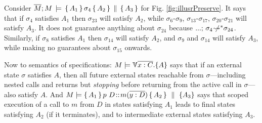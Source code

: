 {\begin{example}
Consider ${\overline{M}; M\, \models \, \{\, A_1\,\}\, \sigma_{4} \, \{\, A_2\,\} \,\parallel\, \{\, A_3\,\}  }$   
for Fig. \ref{fig:illusrPreserve}.
It says that  if  $\sigma_4$ satisfies $A_1$ 
then $\sigma_{23}$ will satisfy $A_2$, while $\sigma_6$-$\sigma_9$, $\sigma_{13}$-$\sigma_{17}$, $\sigma_{20}$-$\sigma_{21}$ will satisfy $A_3$.
It does not guarantee anything about $\sigma_{24}$ because $...;\, {\sigma_4} \not\!\!\!{\rightsquigarrow^*} \sigma_{24}$.
Similarly, if $\sigma_8$ satisfies $A_1$ 
then $\sigma_{14}$ will satisfy $A_2$, and  $\sigma_9$ and $\sigma_{14}$  will satisfy $A_3$, while making no guarantees about  $\sigma_{15}$ onwards.
 \end{example}}

{Now to} %
 semantics of specifications:     $\satisfies{M}{\TwoStatesN {\overline {x:C}} {A}}$ 
says that if an external state $\sigma$ satisfies $A$, then all future external states reachable from $\sigma$—including nested  
 calls and returns but  {\emph{stopping} before}   returning from the active call in $\sigma$— also satisfy $A$. 
 And  $\satisfies{M} { \mprepostN {A_1}{p\ D}{m}{y}{D}{A_2} {A_3} }$ says that scoped execution of a call to $m$ from $D$   in  states satisfying $A_1$ leads to final states satisfying $A_2$ (if it terminates),
 and to intermediate external states satisfying $A_3$.

